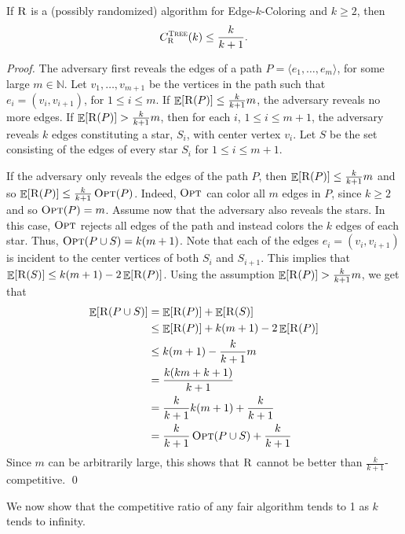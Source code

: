 \documentclass[smallextended]{svjour3}
\def\mck{{\sc Edge-$k$-Coloring}\xspace}
\newcommand{\OPT}{\ensuremath{\operatorname{\textsc{Opt}}}\xspace}
\newcommand{\RAND}{\ensuremath{\operatorname{\textsc{R}}}\xspace}
\DeclareMathOperator{\E}{\mathbb{E}}
\begin{document}
\begin{theorem}
If $\RAND$ is a (possibly randomized) algorithm for \mck and $k\geq 2$, then
\begin{displaymath}
C_{\RAND}^{\text{\sc Tree}}(k)\leq\frac{k}{k+1}.
\end{displaymath} 
\end{theorem}
\begin{proof}
The adversary first reveals the edges of a path $P = \langle e_1,\ldots
, e_m \rangle$, for some large $m\in\mathbb{N}$.
Let $v_1,\ldots, v_{m+1}$ be the vertices in the path such that
 $e_i=(v_i,v_{i+1})$, for $1\leq i\leq m$. 
If $\E[\RAND(P)]\leq\frac{k}{k+1}m$, the adversary reveals no more
edges.  
If $\E[\RAND (P)]>\frac{k}{k+1}m$, then for each $i$, $1\leq i\leq m+1$,
 the adversary reveals $k$ edges constituting a star, $S_i$, with
 center vertex $v_i$. 
Let $S$ be the set consisting of the edges of every star $S_i$ for $1\leq i\leq m+1$.

If the adversary only reveals the edges of the path $P$, then $\E[\RAND (P)]\leq\frac{k}{k+1}m$ and so $\E[\RAND(P)]\leq\frac{k}{k+1}\OPT (P)$. Indeed, \OPT can color all $m$ edges in $P$, since $k\geq 2$ and so $\OPT(P)=m$. Assume now that the adversary also reveals the stars. In this case, \OPT rejects all edges of the path and instead colors the $k$ edges of each star. Thus, $\OPT(P\cup S)=k(m+1)$. Note that each of the edges $e_i=(v_i, v_{i+1})$ is incident to the center vertices of both $S_i$ and $S_{i+1}$. This implies that $\E[\RAND(S)]\leq k(m+1)-2\E[\RAND(P)]$. Using the assumption $\E[\RAND(P)] >\frac{k}{k+1}m$, we get that
\begin{align*}
\E[\RAND(P\cup S)]&=\E[\RAND(P)]+\E[\RAND(S)]\\
&\leq \E[\RAND(P)] + k(m+1)-2\E[\RAND(P)]\\
&\leq k(m+1)-\frac{k}{k+1}m\\
&=\frac{k(km+k+1)}{k+1}\\
&=\frac{k}{k+1}k(m+1)+\frac{k}{k+1}\\
&=\frac{k}{k+1}\OPT (P\cup S)+\frac{k}{k+1}
\end{align*}
Since $m$ can be arbitrarily large, this shows that $\RAND$ cannot be better than $\frac{k}{k+1}$-competitive.
\qed\end{proof}

We now show that 
the competitive ratio of any fair algorithm tends to 1 as $k$ tends to infinity.
\end{document}
